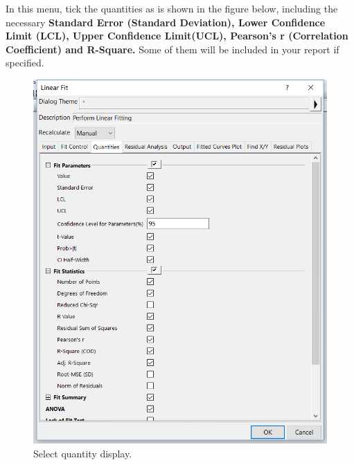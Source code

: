 \documentclass[12pt]{article}
\begin{document}
In this menu, tick the quantities as is shown in the figure below, including the necessary \textbf{Standard Error (Standard Deviation), Lower Confidence Limit (LCL), Upper Confidence Limit(UCL), Pearson's r (Correlation Coefficient) and R-Square. 
}Some of them will be included in your report if specified.
\begin{figure}[H]
\centering
\includegraphics[width=14cm]{o3.png}
\caption{Select quantity display.}
\end{figure}

\newpage
\end{document}
